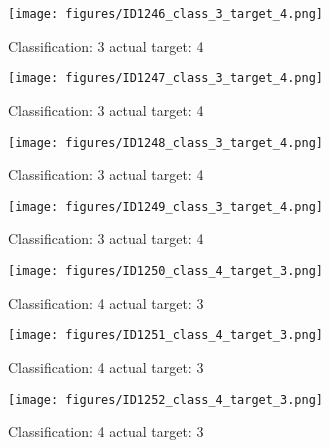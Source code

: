 \begin{figure}[h!]
\begin{center}
\texttt{[image: figures/ID1246\_class\_3\_target\_4.png]}
\end{center}
\caption{ Classification: 3 actual target: 4}
\label{fig:ID1246_class_3_target_4}
\end{figure}
\begin{figure}[h!]
\begin{center}
\texttt{[image: figures/ID1247\_class\_3\_target\_4.png]}
\end{center}
\caption{ Classification: 3 actual target: 4}
\label{fig:ID1247_class_3_target_4}
\end{figure}
\begin{figure}[h!]
\begin{center}
\texttt{[image: figures/ID1248\_class\_3\_target\_4.png]}
\end{center}
\caption{ Classification: 3 actual target: 4}
\label{fig:ID1248_class_3_target_4}
\end{figure}
\begin{figure}[h!]
\begin{center}
\texttt{[image: figures/ID1249\_class\_3\_target\_4.png]}
\end{center}
\caption{ Classification: 3 actual target: 4}
\label{fig:ID1249_class_3_target_4}
\end{figure}
\begin{figure}[h!]
\begin{center}
\texttt{[image: figures/ID1250\_class\_4\_target\_3.png]}
\end{center}
\caption{ Classification: 4 actual target: 3}
\label{fig:ID1250_class_4_target_3}
\end{figure}
\begin{figure}[h!]
\begin{center}
\texttt{[image: figures/ID1251\_class\_4\_target\_3.png]}
\end{center}
\caption{ Classification: 4 actual target: 3}
\label{fig:ID1251_class_4_target_3}
\end{figure}
\begin{figure}[h!]
\begin{center}
\texttt{[image: figures/ID1252\_class\_4\_target\_3.png]}
\end{center}
\caption{ Classification: 4 actual target: 3}
\label{fig:ID1252_class_4_target_3}
\end{figure}
